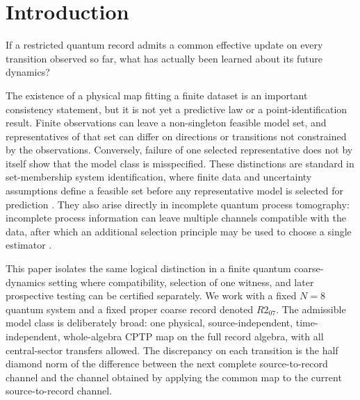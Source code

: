 \section{Introduction}
\label{sec:introduction}

If a restricted quantum record admits a common effective update on every transition observed so far, what has actually been learned about its future dynamics?

The existence of a physical map fitting a finite dataset is an important consistency statement, but it is not yet a predictive law or a point-identification result.  Finite observations can leave a non-singleton feasible model set, and representatives of that set can differ on directions or transitions not constrained by the observations.  Conversely, failure of one selected representative does not by itself show that the model class is misspecified.  These distinctions are standard in set-membership system identification, where finite data and uncertainty assumptions define a feasible set before any representative model is selected for prediction \cite{MilaneseNovara2004,MilaneseNovara2011}.  They also arise directly in incomplete quantum process tomography: incomplete process information can leave multiple channels compatible with the data, after which an additional selection principle may be used to choose a single estimator \cite{Ziman2008,TeoEtAl2011}.

This paper isolates the same logical distinction in a finite quantum coarse-dynamics setting where compatibility, selection of one witness, and later prospective testing can be certified separately.  We work with a fixed $N=8$ quantum system and a fixed proper coarse record denoted $R2_{07}$.  The admissible model class is deliberately broad: one physical, source-independent, time-independent, whole-algebra CPTP map on the full record algebra, with all central-sector transfers allowed.  The discrepancy on each transition is the half diamond norm of the difference between the next complete source-to-record channel and the channel obtained by applying the common map to the current source-to-record channel.

